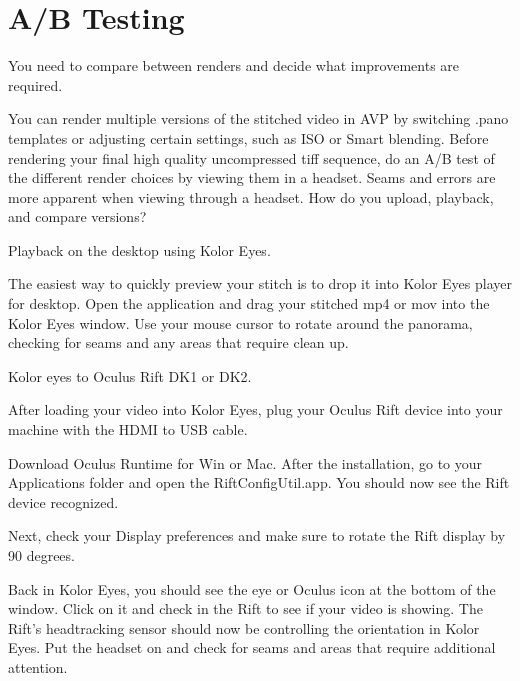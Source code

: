 \section{A/B Testing}
\pagecolor{white}
\label{chap:46}
\begin{fullwidth}

\problem

{\large You need to compare between renders and decide what improvements are required. \par}

You can render multiple versions of the stitched video in AVP by switching .pano templates or adjusting certain settings, such as ISO or Smart blending. Before rendering your final high quality uncompressed tiff sequence, do an A/B test of the different render choices by viewing them in a headset. Seams and errors are more apparent when viewing through a headset. How do you upload, playback, and compare versions?

\solutions

{\large Playback on the desktop using Kolor Eyes. \par}


The easiest way to quickly preview your stitch is to drop it into Kolor Eyes player for desktop. Open the application and drag your stitched mp4 or mov into the Kolor Eyes window. Use your mouse cursor to rotate around the panorama, checking for seams and any areas that require clean up.  

{\large Kolor eyes to Oculus Rift DK1 or DK2. \par}

After loading your video into Kolor Eyes, plug your Oculus Rift device into your machine with the HDMI to USB cable.

Download Oculus Runtime for Win or Mac. After the installation, go to your Applications folder and open the RiftConfigUtil.app. You should now see the Rift device recognized.


Next, check your Display preferences and make sure to rotate the Rift display by 90 degrees.


Back in Kolor Eyes, you should see the eye or Oculus icon at the bottom of the window. Click on it and check in the Rift to see if your video is showing. The Rift’s headtracking sensor should now be controlling the orientation in Kolor Eyes. Put the headset on and check for seams and areas that require additional attention.


\end{fullwidth}

